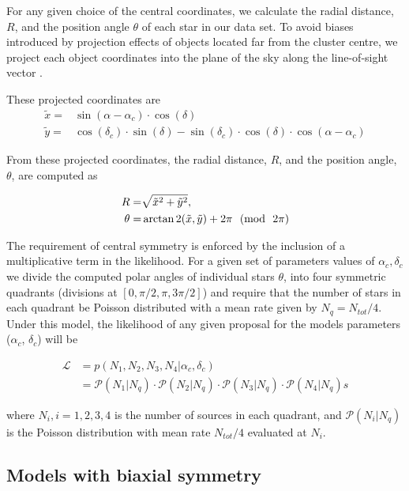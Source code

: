 For any given choice of the central coordinates, 
we calculate the radial distance, $R$, and the position angle $\theta$ 
of each star in our data set. To avoid biases introduced by projection 
effects of objects located far from the cluster centre, we project each 
object coordinates into the plane of the sky along the line-of-sight 
vector \cite[see for example, Eq. 1 of][]{2006A&A...445..513V}. 

These projected coordinates are
\begin{align}
\tilde{x} =&\sin(\alpha - \alpha_c ) \cdot \cos(\delta)\nonumber\\
\tilde{y} = &\cos(\delta_c)\cdot \sin(\delta) - \sin(\delta_c)\cdot \cos(\delta)\cdot\cos(\alpha - \alpha_c)
\label{eq:distfree}
\end{align}

From these projected coordinates, the radial distance, $R$, and the position angle, $\theta$, are computed as 

\begin{align}
R=& \sqrt{\tilde{x}^2 + \tilde{y}^2},\nonumber\\
\theta=& \arctan2 (\tilde{x},\tilde{y}) +2\pi \ \ (\rm{mod}\ \ 2 \pi)
\label{eq:rs_and_ts}
\end{align}

The requirement of central symmetry is enforced by the inclusion of a
multiplicative term in the likelihood. For a given set of parameters values
of $\alpha_c, \delta_c$ we divide the computed polar angles of
individual stars $\theta$, into four symmetric quadrants (divisions at $[0,\pi/2,\pi,3\pi/2]$) and require that the number of
stars in each quadrant be Poisson distributed with a mean rate given
by $N_q=N_{tot}/4$. Under this model, the likelihood of any given
proposal for the models parameters ($\alpha_c$, $\delta_c$)
will be

\begin{align}
\mathcal{L} & = p(N_1,N_2,N_3,N_4|\alpha_c,\delta_c)\nonumber  \\
& =\mathcal{P}(N_1|N_q)\cdot \mathcal{P}(N_2|N_q)\cdot \mathcal{P}(N_3|N_q)\cdot
\mathcal{P}(N_4|N_q) s\end{align}

where $N_i, i=1,2,3,4$ is the number of sources in each quadrant, and
$\mathcal{P}(N_i|N_q)$ is the Poisson distribution with mean rate
$N_{tot}/4$ evaluated at $N_i$.

\subsection{Models with biaxial symmetry}
\label{sec:modelselell}

